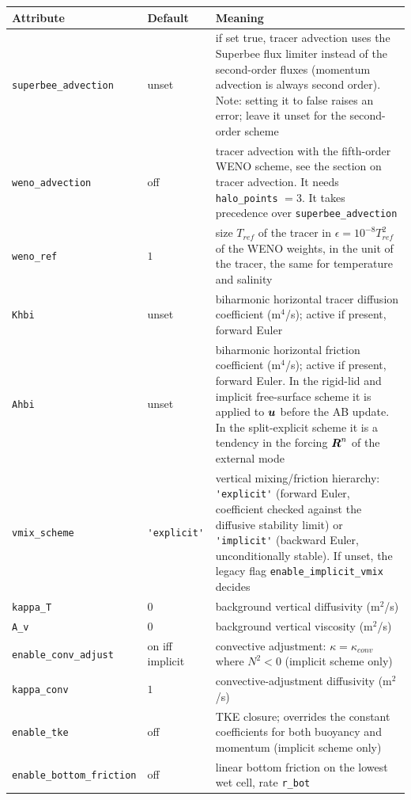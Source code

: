 \documentclass[12pt]{article}
\renewcommand{\v}[1]{{\mbox{\boldmath$ #1 $}}}  %
\begin{document}
\begin{longtable}{@{}llp{5.9cm}@{}}
\hline
Attribute & Default & Meaning \\
\hline
\endhead
\verb|superbee_advection| & unset & if set true, tracer advection uses the
  Superbee flux limiter instead of the second-order fluxes (momentum
  advection is always second order). Note: setting it to false raises an
  error; leave it unset for the second-order scheme \\
\verb|weno_advection| & off & tracer advection with the fifth-order WENO
  scheme, see the section on tracer advection. It needs \verb|halo_points|
  $=3$. It takes precedence over \verb|superbee_advection| \\
\verb|weno_ref| & $1$ & size $T_{ref}$ of the tracer in
  $\epsilon = 10^{-8} T_{ref}^2$ of the WENO weights, in the unit of the
  tracer, the same for temperature and salinity \\
\verb|Khbi| & unset & biharmonic horizontal tracer diffusion coefficient
  (m$^4$/s); active if present, forward Euler \\
\verb|Ahbi| & unset & biharmonic horizontal friction coefficient (m$^4$/s);
  active if present, forward Euler. In the rigid-lid and implicit
  free-surface scheme it is applied to $\v u$ before the AB update. In the
  split-explicit scheme it is a tendency in the forcing $\v R^n$ of the
  external mode \\
\verb|vmix_scheme| & \verb|'explicit'| & vertical mixing/friction hierarchy:
  \verb|'explicit'| (forward Euler, coefficient checked against the
  diffusive stability limit) or \verb|'implicit'| (backward Euler,
  unconditionally stable). If unset, the legacy flag
  \verb|enable_implicit_vmix| decides \\
\verb|kappa_T| & $0$ & background vertical diffusivity (m$^2$/s) \\
\verb|A_v| & $0$ & background vertical viscosity (m$^2$/s) \\
\verb|enable_conv_adjust| & on iff implicit & convective adjustment:
  $\kappa = \kappa_{conv}$ where $N^2 < 0$ (implicit scheme only) \\
\verb|kappa_conv| & $1$ & convective-adjustment diffusivity (m$^2$/s) \\
\verb|enable_tke| & off & TKE closure; overrides the constant coefficients
  for both buoyancy and momentum (implicit scheme only) \\
\verb|enable_bottom_friction| & off & linear bottom friction on the lowest
  wet cell, rate \verb|r_bot| \\

\end{longtable}
\end{document}
